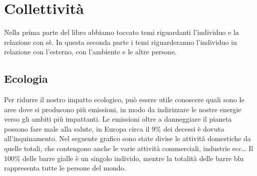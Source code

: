 \documentclass[12pt]{book} %
\begin{document}
\clearpage
\section{Collettività}

Nella prima parte del libro abbiamo toccato temi riguardanti l'individuo e la relazione con sè. In questa seconda parte i temi riguarderanno l'individuo in relazione con l'esterno, con l'ambiente e le altre persone.

\subsection{Ecologia}

Per ridurre il nostro impatto ecologico, può essere utile conoscere quali sono le aree dove si producono più emissioni, in modo da indirizzare le nostre energie verso gli ambiti più impattanti. Le emissioni oltre a danneggiare il pianeta possono fare male alla salute, in Europa circa il 9\% dei decessi è dovuto all'inquinamento. 
Nel seguente grafico sono state divise le attività domestiche da quelle totali, che contengono anche le varie attività commerciali, industrie ecc…
Il 100\% delle barre gialle è un singolo individo, mentre la totalità delle barre blu rappresenta tutte le persone del mondo.

\needspace{4cm}


\makeatletter
\newcommand\resetstackseries{\pgfplots@stacked@isfirstplottrue}
\makeatother
\end{document}
